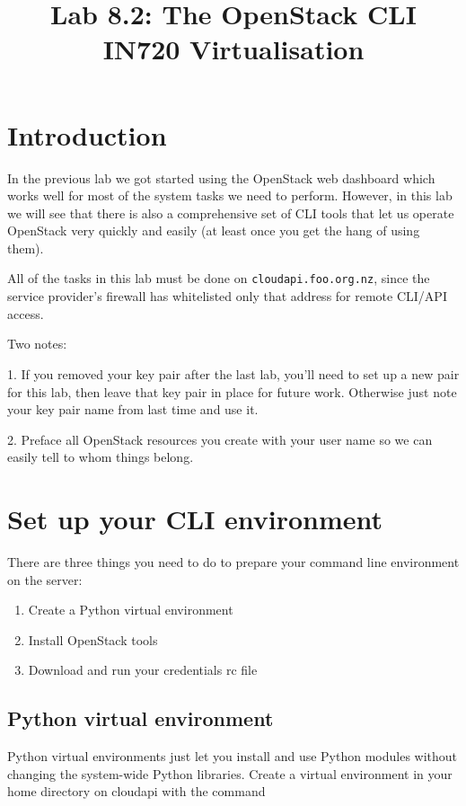 \documentclass{article}
\begin{document}
\title{Lab 8.2: The OpenStack CLI \\ IN720 Virtualisation}
\date{}
\maketitle

\section*{Introduction}
In the previous lab we got started using the OpenStack web dashboard which works well for most of the system tasks we need to perform. However, in this lab we will see that there is also a comprehensive set of CLI tools that let us operate OpenStack very quickly and easily (at least once you get the hang of using them).

All of the tasks in this lab must be done on \texttt{cloudapi.foo.org.nz}, since the service provider's firewall has whitelisted only that address for remote CLI/API access. 

Two notes:

1. If you removed your key pair after the last lab, you'll need to set up a new pair for this lab, then leave that key pair in place for future work. Otherwise just note your key pair name from last time and use it.

2. Preface all OpenStack resources you create with your user name so we can easily tell to whom things belong.

\section{Set up your CLI environment}
There are three things you need to do to prepare your command line environment on the server:

\begin{enumerate}
 \item Create a Python virtual environment
 \item Install OpenStack tools
 \item Download and run your credentials rc file
\end{enumerate}

 \subsection{Python virtual environment}
  Python virtual environments just let you install and use Python modules without changing the system-wide Python libraries. Create a virtual environment in your home directory on cloudapi with the command 
  
\end{document}
